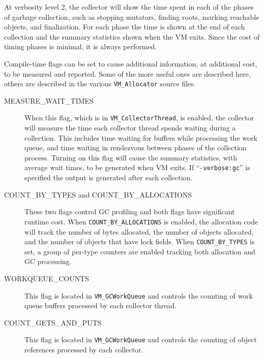At verbosity level 2, the collector will show the time spent in each
of the phases of garbage collection, such as stopping mutators,
finding roots, marking reachable objects, and finalization.  For each
phase the time is shown at the end of each collection and the summary
statistics shown when the VM exits.  Since the cost of timing phases
is minimal, it is always performed.

Compile-time flags can be set to cause additional information, at additional
cost, to be measured and reported.  Some of the more useful ones are
described here, others are described in the various {\tt VM\_Allocator}
source files.

\begin{description}
\item[MEASURE\_WAIT\_TIMES]
When this flag, which is in {\tt VM\_CollectorThread}, is enabled, 
the collector will measure the time each collector thread
spends waiting during a collection.  This includes time waiting for buffers while
processing the work queue, and time waiting in rendezvous between phases of the
collection process. Turning on this flag will cause
the summary statistics, with average wait times, to be generated when VM exits.  
If ``{\tt -verbose:gc}'' is specified the output is generated after each collection.

\item[COUNT\_BY\_TYPES and COUNT\_BY\_ALLOCATIONS]
These two flags control GC profiling and both flags have significant runtime cost.
When {\tt COUNT\_BY\_ALLOCATIONS} is enabled, the allocation code will track the number
of bytes allocated, the number of objects allocated, and the number of objects that have
lock fields.  When {\tt COUNT\_BY\_TYPES} is set, a group of per-type counters are enabled
tracking both allocation and GC processing.

\item[WORKQUEUE\_COUNTS]
This flag is located in {\tt VM\_GCWorkQueue} and controls the counting of work queue buffers
processed by each collector thread.

\item[COUNT\_GETS\_AND\_PUTS]
This flag is located in {\tt VM\_GCWorkQueue} and controls the counting of object references 
processed by each collector.

\end{description}

